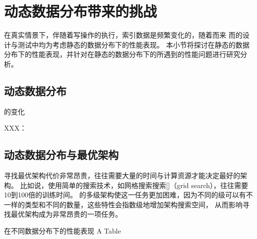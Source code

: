 \section{动态数据分布带来的挑战}

在真实情景下，伴随着写操作的执行，索引数据是频繁变化的，随着而来
而{\li}的设计与测试中均为考虑静态的数据分布下的性能表现。
本小节将探讨{\li}在静态的数据分布下的性能表现，并针对{\li}在静态的数据分布下的所遇到的性能问题进行研究分析。

\subsection{动态数据分布}

{\cdf}的变化

XXX：

\subsection{动态数据分布与最优{\li}架构}

寻找最优{\li}架构代价非常昂贵，往往需要大量的时间与计算资源才能决定最好的{\li}架构。
比如说，使用简单的搜索技术，如网格搜索搜索[]（grid search），往往需要10到100倍的训练时间。
{\li}的多级架构使这一任务更加困难，因为不同的级可以有不一样的{\model}类型和不同的{\model}数量，这些特性会指数级地增加架构搜索空间，
从而影响寻找最优{\li}架构成为非常昂贵的一项任务。


% 

\begin{table}[!hpb]
  \centering
  \bicaption[指向一个表格的表目录索引]
    {{\li}在不同数据分布下的性能表现}
    {A Table}
  \label{tab:dist}
  \begin{tabular}{@{}llr@{}} \toprule
  \end{tabular}
\end{table}


